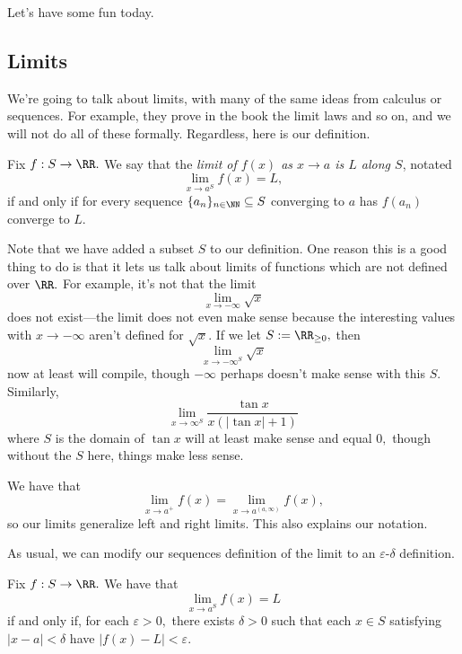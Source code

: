 \documentclass[../notes.tex]{subfiles}
\begin{document}














Let's have some fun today.

\subsection{Limits}
We're going to talk about limits, with many of the same ideas from calculus or sequences. For example, they prove in the book the limit laws and so on, and we will not do all of these formally. Regardless, here is our definition.
\begin{definition}[Limits]
	Fix $f:S\to\RR.$ We say that the \textit{limit of $f(x)$ as $x\to a$ is $L$ along $S$}, notated
	\[\lim_{x\to a^S}f(x)=L,\]
	if and only if for every sequence $\{a_n\}_{n\in\NN}\subseteq S$ converging to $a$ has $f(a_n)$ converge to $L.$
\end{definition}
Note that we have added a subset $S$ to our definition. One reason this is a good thing to do is that it lets us talk about limits of functions which are not defined over $\RR.$ For example, it's not that the limit
\[\lim_{x\to-\infty}\sqrt x\]
does not exist---the limit does not even make sense because the interesting values with $x\to-\infty$ aren't defined for $\sqrt x.$ If we let $S:=\RR_{\ge0},$ then
\[\lim_{x\to-\infty^S}\sqrt x\]
now at least will compile, though $-\infty$ perhaps doesn't make sense with this $S.$ Similarly,
\[\lim_{x\to\infty^S}\frac{\tan x}{x(|\tan x|+1)}\]
where $S$ is the domain of $\tan x$ will at least make sense and equal $0,$ though without the $S$ here, things make less sense.
\begin{remark}
	We have that
	\[\lim_{x\to a^+}f(x)=\lim_{x\to a^{(a,\infty)}}f(x),\]
	so our limits generalize left and right limits. This also explains our notation.
\end{remark}
As usual, we can modify our sequences definition of the limit to an $\varepsilon$-$\delta$ definition.
\begin{proposition}
	Fix $f:S\to\RR.$ We have that
	\[\lim_{x\to a^S}f(x)=L\]
	if and only if, for each $\varepsilon>0,$ there exists $\delta>0$ such that each $x\in S$ satisfying $|x-a|<\delta$ have $|f(x)-L|<\varepsilon.$
\end{proposition}
\end{document}
